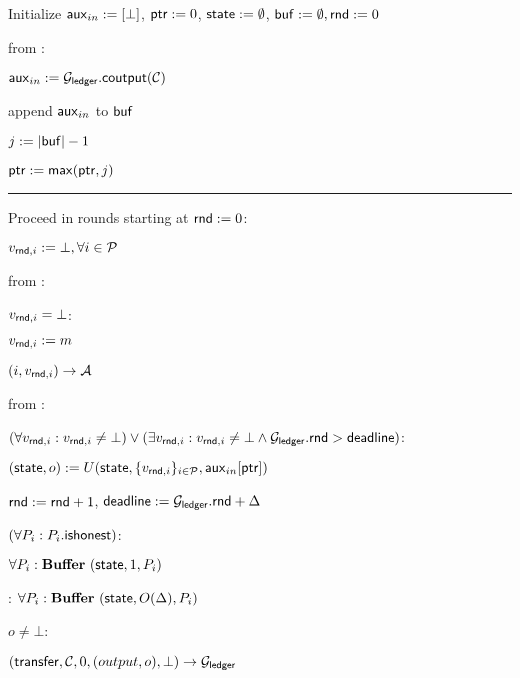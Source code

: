 \begin{bbox}[title={$\Fstate (U, \mathcal{C}, \mathcal{P} = \{P_1,...,P_N\}, \Delta)$}]

Initialize ${\mathsf {aux}}_{in} := [\bot]$, ${\mathsf {ptr}} := 0$, ${\mathsf {state}} := \emptyset$, ${\mathsf {buf}} := \emptyset, {\mathsf {rnd}} := 0$

\OnInput {} from \Partyi:

	\quad ${\mathsf {aux}}_{in} := \mathcal{G}_{{\mathsf {ledger}}}.{\mathsf {coutput}}(\mathcal{C})$

	\quad append ${\mathsf {aux}}_{in}$ to ${\mathsf {buf}}$

	\quad $j := |{\mathsf {buf}}| - 1$

	\quad ${\mathsf {ptr}} := {\mathsf {max}}({\mathsf {ptr}},j)$ 

\vspace{2mm} \hrule \vspace{2mm}

Proceed in rounds starting at ${\mathsf {rnd}} := 0$:

	$v_{{\mathsf {rnd}},i} := \bot, \forall i \in \mathcal{P}$

\OnInput {} from \Partyi:

	\quad \If $v_{{\mathsf {rnd}},i} = \bot$:

		\qquad $v_{{\mathsf {rnd}},i} := m$

		\qquad \Leak $(i,v_{{\mathsf {rnd}},i}) \rightarrow \mathcal{A}$

\OnInput {} from \Partyi:

	\quad \If $\left( \forall v_{{\mathsf {rnd}},i} :  v_{{\mathsf {rnd}},i} \neq \bot \right) \vee \left( \exists v_{{\mathsf {rnd}},i} : v_{{\mathsf {rnd}},i} \neq \bot \wedge \mathcal{G}_{{\mathsf {ledger}}}.{\mathsf {rnd}} > {\mathsf {deadline}} \right)$:

		\qquad $({\mathsf {state}},o) := U({\mathsf {state}}, \{v_{{\mathsf {rnd}},i}\}_{i\in\mathcal{P}}, {\mathsf {aux}}_{in}[{\mathsf {ptr}}])$
		
		\qquad ${\mathsf {rnd}} := {\mathsf {rnd}} + 1$, ${\mathsf {deadline}} := \mathcal{G}_{{\mathsf {ledger}}}.{\mathsf {rnd}} + \Delta$	

		\qquad \If $\left( \forall P_i : P_i.{\mathsf {ishonest}} \right)$:
			
			\qqquad $\forall P_i : \textbf{Buffer}~ ({\mathsf {state}}, 1, P_i)$

		\qquad \Else: $\forall P_i : \textbf{Buffer}~ ({\mathsf {state}}, O(\Delta), P_i)$

		\qquad \If $o \neq \bot$:

		\qqquad \Send $({\mathsf {transfer}},\mathcal{C},0,(output, o), \bot) \rightarrow \mathcal{G}_{{\mathsf {ledger}}}$ 
		

\end{bbox}
